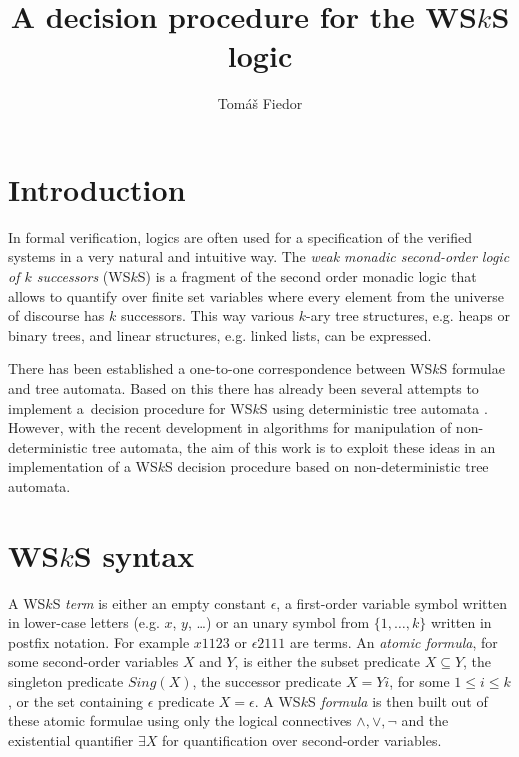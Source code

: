 \documentclass{eeict}
\title{A decision procedure for the WS$k$S logic}
\author{Tomáš Fiedor}
\begin{document}
\maketitle

\section{Introduction}

In formal verification, logics are often used for a specification of the
verified systems in a very natural and intuitive way. The \emph{weak monadic
second-order logic of $k$ successors} (WS$k$S) \cite{wsks} is a fragment of the
second order monadic logic that allows to quantify over finite set variables
where every element from the universe of discourse has $k$ successors. This way
various $k$-ary tree structures, e.g.
heaps or binary trees, and linear structures, e.g. linked lists, can be expressed.

There has been established a
one-to-one correspondence between WS$k$S formulae and tree automata. Based
on this there has already been several attempts to implement a~decision
procedure for WS$k$S using deterministic tree automata \cite{mona}. However,
with the recent development in algorithms for manipulation of
non-deterministic tree automata, the aim of this work is to exploit these ideas
in an implementation of a WS$k$S decision procedure based on non-deterministic
tree automata.

\section{WS$k$S syntax}

A WS$k$S \emph{term} is either an empty constant $\epsilon$, a first-order
variable symbol written in lower-case letters (e.g. $x$, $y$, \ldots) or an
unary symbol from $\{1,\ldots,k\}$ written in postfix notation. For example
$x1123$ or $\epsilon2111$ are terms. An \emph{atomic formula}, for some
second-order variables $X$ and $Y$, is either the subset predicate $X
\subseteq Y$, the singleton predicate $Sing(X)$, the successor predicate $X =
Yi$, for some $1 \leq i \leq k$, or the set containing $\epsilon$ predicate $X
= \epsilon$.
A WS$k$S \emph{formula} is then built out of these atomic formulae using only the
logical connectives $\wedge, \vee, \neg$ and the existential quantifier $\exists
X$ for quantification over second-order variables.
\end{document}
